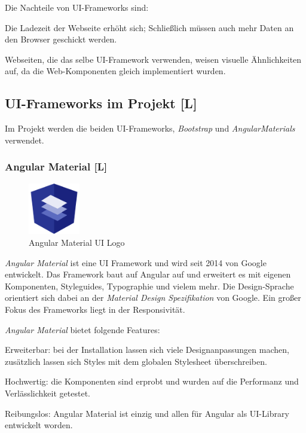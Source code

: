 Die Nachteile von UI-Frameworks sind: 
\begin{compactitem}
    \item Die Ladezeit der Webseite erhöht sich;
    Schließlich müssen auch mehr Daten an den Browser geschickt werden.
    \item Webseiten, die das selbe UI-Framework verwenden, weisen visuelle Ähnlichkeiten auf, da die Web-Komponenten gleich implementiert wurden.
\end{compactitem}


\subsection{UI-Frameworks im Projekt [L]}
Im Projekt werden die beiden UI-Frameworks, \emph{Bootstrap} und \emph{AngularMaterials} verwendet.


\subsubsection{Angular Material [L]}
\begin{figure}
  \begin{center}
    \includegraphics[width=0.2\textwidth]{pics/Angular_Material_UI_Logo.png}
   \caption{Angular Material UI Logo}
  \end{center}
\end{figure}
\emph{Angular Material} ist eine UI Framework und wird seit 2014 von Google entwickelt. Das Framework baut auf Angular auf und erweitert es mit eigenen Komponenten, Styleguides, Typographie und vielem mehr. Die Design-Sprache orientiert sich dabei an der \emph{Material Design Spezifikation} von Google. Ein großer Fokus des Frameworks liegt in der Responsivität. \cite{JavaPointAngularMaterial, WhatAngularMaterial}


\emph{Angular Material} bietet folgende Features: 
\begin{compactitem}
    \item Erweiterbar: bei der Installation lassen sich viele Designanpassungen machen, zusätzlich lassen sich Styles mit dem globalen Stylesheet überschreiben. \cite{JavaPointAngularMaterial}
    \item Hochwertig: die Komponenten sind erprobt und wurden auf die Performanz und Verlässlichkeit getestet. \cite{JavaPointAngularMaterial}
    \item Reibungslos: Angular Material ist einzig und allen für Angular als UI-Library entwickelt worden.\cite{JavaPointAngularMaterial}
\end{compactitem}

